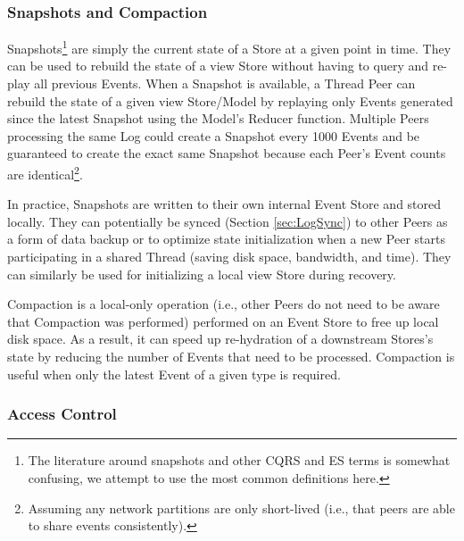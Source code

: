\documentclass{textile}
\begin{document}
\subsubsection{Snapshots and Compaction}\label{sec:SnapshotsCompaction}

Snapshots\footnote{The literature around snapshots and other CQRS and ES terms is somewhat confusing, we attempt to use the most common definitions here.} are simply the current state of a Store at a given point in time. They can be used to rebuild the state of a view Store without having to query and re-play all previous Events. When a Snapshot is available, a Thread Peer can rebuild the state of a given view Store/Model by replaying only Events generated since the latest Snapshot using the Model's Reducer function. Multiple Peers processing the same Log could create a Snapshot every 1000 Events and be guaranteed to create the exact same Snapshot because each Peer's Event counts are identical\footnote{Assuming any network partitions are only short-lived (i.e., that peers are able to share events consistently).}. 

In practice, Snapshots are written to their own internal Event Store and stored locally. They can potentially be synced (Section \ref{sec:LogSync}) to other Peers as a form of data backup or to optimize state initialization when a new Peer starts participating in a shared Thread (saving disk space, bandwidth, and time). They can similarly be used for initializing a local view Store during recovery.

Compaction is a local-only operation (i.e., other Peers do not need to be aware that Compaction was performed) performed on an Event Store to free up local disk space. As a result, it can speed up re-hydration of a downstream Stores's state by reducing the number of Events that need to be processed. Compaction is useful when only the latest Event of a given type is required. 

\subsubsection{Access Control} \label{sec:AccessControl}
\end{document}
